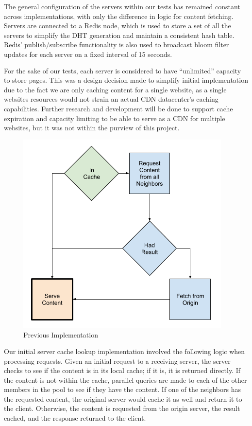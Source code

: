 \documentclass[conference]{IEEEtran}
\begin{document}
The general configuration of the servers within our tests has remained constant across implementations, with only the difference in logic for content fetching.  Servers are connected to a Redis node, which is used to store a set of all the servers to simplify the DHT generation and maintain a consistent hash table.  Redis’ publish/subscribe functionality is also used to broadcast bloom filter updates for each server on a fixed interval of 15 seconds.

For the sake of our tests, each server is considered to have “unlimited” capacity to store pages.  This was a design decision made to simplify initial implementation due to the fact we are only caching content for a single website, as a single websites resources would not strain an actual CDN datacenter’s caching capabilities.  Further research and development will be done to support cache expiration and capacity limiting to be able to serve as a CDN for multiple websites, but it was not within the purview of this project. 

\begin{figure}[!h]
	\centering
	\includegraphics[width=0.7\columnwidth]{figures/cache_logic_before.png}
	\caption{Previous Implementation}
\end{figure}

Our initial server cache lookup implementation involved the following logic when processing requests. Given an initial request to a receiving server, the server checks to see if the content is in its local cache; if it is, it is returned directly.  If the content is not within the cache, parallel queries are made to each of the other members in the pool to see if they have the content.  If one of the neighbors has the requested content, the original server would cache it as well and return it to the client. Otherwise, the content is requested from the origin server, the result cached, and the response returned to the client. 
\end{document}
